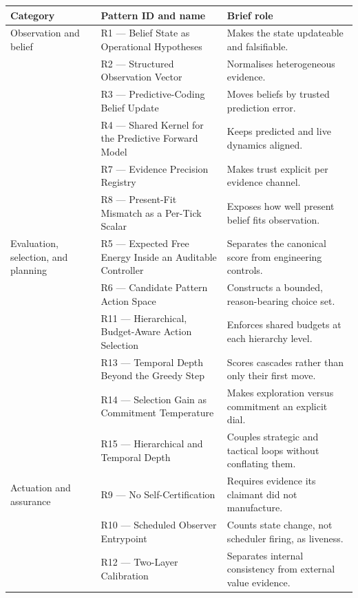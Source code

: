 \begingroup
\small
\setlength{\tabcolsep}{4pt}
\begin{longtable}{@{}>{\raggedright\arraybackslash}p{.16\linewidth}
                       >{\raggedright\arraybackslash}p{.39\linewidth}
                       >{\raggedright\arraybackslash}p{.39\linewidth}@{}}
\toprule
Category & Pattern ID and name & Brief role \\
\midrule
\endhead
Observation and belief & R1 --- Belief State as Operational Hypotheses & Makes the state updateable and falsifiable. \\
 & R2 --- Structured Observation Vector & Normalises heterogeneous evidence. \\
 & R3 --- Predictive-Coding Belief Update & Moves beliefs by trusted prediction error. \\
 & R4 --- Shared Kernel for the Predictive Forward Model & Keeps predicted and live dynamics aligned. \\
 & R7 --- Evidence Precision Registry & Makes trust explicit per evidence channel. \\
 & R8 --- Present-Fit Mismatch as a Per-Tick Scalar & Exposes how well present belief fits observation. \\
\addlinespace
Evaluation, selection, and planning & R5 --- Expected Free Energy Inside an Auditable Controller & Separates the canonical score from engineering controls. \\
 & R6 --- Candidate Pattern Action Space & Constructs a bounded, reason-bearing choice set. \\
 & R11\apparatusmark{} --- Hierarchical, Budget-Aware Action Selection & Enforces shared budgets at each hierarchy level. \\
 & R13 --- Temporal Depth Beyond the Greedy Step & Scores cascades rather than only their first move. \\
 & R14 --- Selection Gain as Commitment Temperature & Makes exploration versus commitment an explicit dial. \\
 & R15 --- Hierarchical and Temporal Depth & Couples strategic and tactical loops without conflating them. \\
\addlinespace
Actuation and assurance & R9\apparatusmark{} --- No Self-Certification & Requires evidence its claimant did not manufacture. \\
 & R10\apparatusmark{} --- Scheduled Observer Entrypoint & Counts state change, not scheduler firing, as liveness. \\
 & R12 --- Two-Layer Calibration & Separates internal consistency from external value evidence. \\

\end{longtable}
